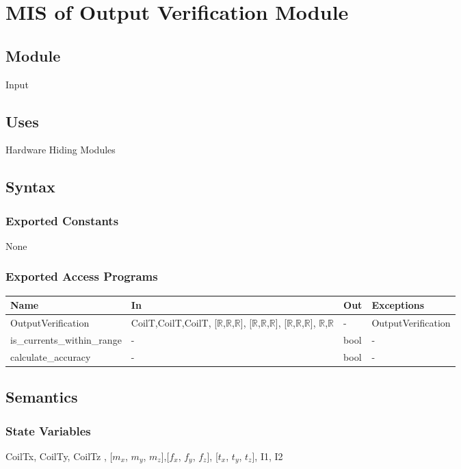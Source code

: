 \documentclass[12pt, titlepage]{article}
\begin{document}
\section{MIS of Output Verification Module} \label{MOV}

\subsection{Module}
Input

\subsection{Uses}
Hardware Hiding Modules

\subsection{Syntax}

\subsubsection{Exported Constants}
None
\subsubsection{Exported Access Programs}

\begin{center}
\begin{tabular}{p{4cm} p{3cm} p{4cm} p{2cm}}
\hline
\textbf{Name} & \textbf{In} & \textbf{Out} & \textbf{Exceptions} \\
\hline
OutputVerification & CoilT,CoilT,CoilT, [$\mathbb{R}$,$\mathbb{R}$,$\mathbb{R}$], [$\mathbb{R}$,$\mathbb{R}$,$\mathbb{R}$], [$\mathbb{R}$,$\mathbb{R}$,$\mathbb{R}$], $\mathbb{R}$,$\mathbb{R}$ & - & OutputVerification  \\
\hline
is\_currents\_within\_range & - & bool & -  \\
\hline

calculate\_accuracy & - & bool & -  \\
\hline
\end{tabular}
\end{center}

\subsection{Semantics}

\subsubsection{State Variables}
CoilTx,  CoilTy,  CoilTz , [$m_x$, $m_y$, $m_z$],[$f_x$, $f_y$, $f_z$], [$t_x$, $t_y$, $t_z$], I1, I2
\end{document}
